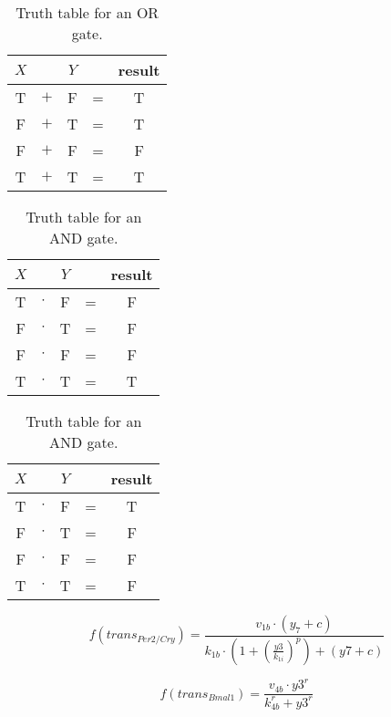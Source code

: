 \documentclass[]{article}
\begin{document}
	\begin{table}[h]
		\centering
		\begin{tabular}{|c|c|c|c|c|}
			\hline
			$X$ & & $Y$ & & result \\ \hline
			T & $+$ & F & = & T \\ \hline
			F & $+$ & T & = & T \\ \hline
			F & $+$ & F & = & F \\ \hline
			T & $+$ & T & = & T \\ \hline
		\end{tabular}
		\caption{Truth table for an OR gate.}
		\label{tab:OR}
	\end{table}

	\begin{table}[h]
		\centering
		\begin{tabular}{|c|c|c|c|c|}
			\hline
			$X$ & & $Y$ & & result \\ \hline
			T & $\cdot$ & F & = & F \\ \hline
			F & $\cdot$ & T & = & F \\ \hline
			F & $\cdot$ & F & = & F \\ \hline
			T & $\cdot$ & T & = & T \\ \hline
		\end{tabular}
		\caption{Truth table for an AND gate.}
		\label{tab:AND}
	\end{table}
	
	\begin{table}[h]
		\centering
		\begin{tabular}{|c|c|c|c|c|}
			\hline
			$X$ & & $Y$ & & result \\ \hline
			T & $\cdot$ & F & = & T \\ \hline
			F & $\cdot$ & T & = & F \\ \hline
			F & $\cdot$ & F & = & F \\ \hline
			T & $\cdot$ & T & = & F \\ \hline
		\end{tabular}
		\caption{Truth table for an AND gate.}
		\label{tab:AND NOT}
	\end{table}

	\begin{equation}\label{eq:y1}
		f(\textit{trans}_\textit{Per2/Cry}) = \frac{v_{1b} \cdot (y_7 + c)}{k_{1b} \cdot (1 + (\frac{y3}{k_{1i}})^p) + (y7 + c)}
	\end{equation}

	\begin{equation}\label{eq:y4}
	f(\textit{trans}_\textit{Bmal1}) = \frac{v_{4b} \cdot y3^r}{k_{4b}^r + y3^r}
	\end{equation}
	
\end{document}
